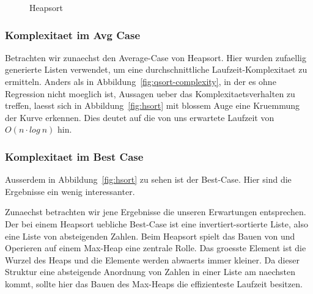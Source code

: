 \begin{figure}[hbt]
    \centering
    \caption{Heapsort}
\end{figure}

\subsubsection{Komplexitaet im Avg Case}\label{subsec:Komplexitaet im Average-Case}

Betrachten wir zunaechst den Average-Case von Heapsort.
Hier wurden zufaellig generierte Listen verwendet, um eine durchschnittliche Laufzeit-Komplexitaet zu ermitteln.
Anders als in Abbildung~\ref{fig:qsort-complexity}, in der es ohne Regression nicht moeglich ist, Aussagen ueber das Komplexitaetsverhalten zu treffen, laesst sich in Abbildung~\ref{fig:hsort} mit blossem Auge eine Kruemmung der Kurve erkennen.
Dies deutet auf die von uns erwartete Laufzeit von \(O(n\cdot log\ n)\) hin.

\subsubsection{Komplexitaet im Best Case}\label{subsec:Komplexitaet im Best-Case}

Ausserdem in Abbildung~\ref{fig:hsort} zu sehen ist der Best-Case.
Hier sind die Ergebnisse ein wenig interessanter.

Zunaechst betrachten wir jene Ergebnisse die unseren Erwartungen entsprechen.
Der bei einem Heapsort uebliche Best-Case ist eine invertiert-sortierte Liste, also eine Liste von absteigenden Zahlen.
Beim Heapsort spielt das Bauen von und Operieren auf einem Max-Heap eine zentrale Rolle.
Das groesste Element ist die Wurzel des Heaps und die Elemente werden abwaerts immer kleiner. 
Da dieser Struktur eine absteigende Anordnung von Zahlen in einer Liste am naechsten kommt, sollte hier das Bauen des Max-Heaps die effizienteste Laufzeit besitzen.


